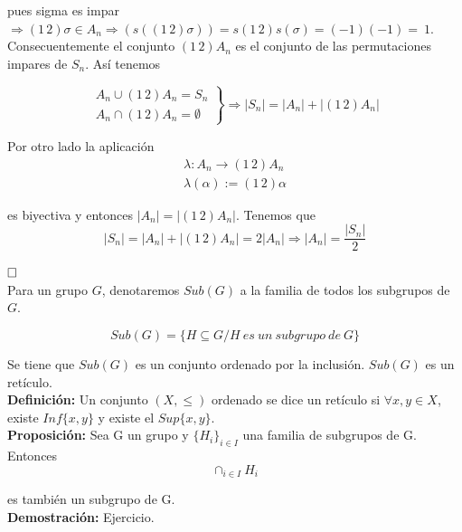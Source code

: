 \documentclass{article}
\begin{document}
pues sigma es impar $\Rightarrow (1\,2)\sigma \in A_n \Rightarrow (s((1\,2)\sigma))=s(1\,2)s(\sigma)=(-1)(-1)=~1$. \\

Consecuentemente el conjunto $(1\,2)A_n$ es el conjunto de las permutaciones impares de $S_n$. Así tenemos

\begin{equation*}
\left. \begin{array}{c}
A_n\cup (1\,2)A_n=S_n \\
A_n\cap (1\,2)A_n=\emptyset
\end{array} \right\rbrace
\Rightarrow |S_n|=|A_n|+|(1\,2)A_n|
\end{equation*}

Por otro lado la aplicación
\begin{gather*}
\lambda:A_n \rightarrow (1\,2)A_n \\
\lambda(\alpha):=(1\,2)\alpha
\end{gather*}

es biyectiva y entonces $|A_n|=|(1\,2)A_n|$. Tenemos que 
\begin{equation*}
|S_n|=|A_n|+|(1\,2)A_n|=2|A_n|\Rightarrow |A_n|=\frac{|S_n|}{2}
\end{equation*}

$\hfill\square$ \\

Para un grupo $G$, denotaremos $Sub(G)$ a la familia de todos los subgrupos de $G$.

\begin{equation*}
Sub(G)=\{H\subseteq G/H\:es\:un\:subgrupo\:de\:G\}
\end{equation*}

Se tiene que $Sub(G)$ es un conjunto ordenado por la inclusión. $Sub(G)$ es un retículo. \\

\textbf{Definición:} Un conjunto $(X,\leq)$ ordenado se dice un retículo si $\forall x,y\in X$, existe $Inf\{x,y\}$ y existe el $Sup\{x,y\}$. \\

\textbf{Proposición:} Sea G un grupo y $\{H_i\}_{i \in I}$ una familia de subgrupos de G. Entonces
\begin{equation*}
\cap_{i\in I}H_i
\end{equation*}

es también un subgrupo de G. \\

\textbf{Demostración:} Ejercicio. \\
\end{document}
